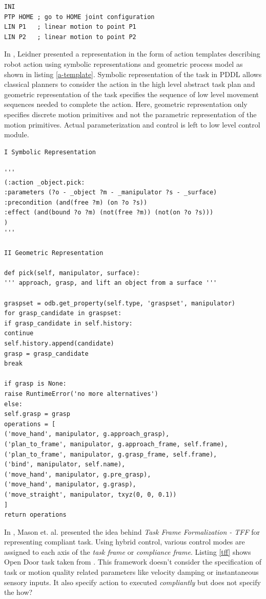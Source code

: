\documentclass[thesis]{mas_proposal}
\begin{document}
\begin{lstlisting}[label=KRL-sample,caption=KRL code]
INI
PTP HOME ; go to HOME joint configuration
LIN P1   ; linear motion to point P1
LIN P2	 ; linear motion to point P2
\end{lstlisting}

In \cite{leidner2017cognitive}, Leidner presented a representation in the form of action templates describing robot action using symbolic representations and geometric process model as shown in listing \ref{a-template}.  Symbolic representation of the task in PDDL allows classical planners to consider the action in the high level abstract task plan and geometric representation of the task specifies the sequence of low level movement sequences needed to complete the action. Here, geometric representation only specifies discrete motion primitives and not the parametric representation of the motion primitives. Actual parameterization and control is left to low level control module.   

\begin{lstlisting}[label=a-template,caption=Action Template: \_object.pick]
I Symbolic Representation 

'''
(:action _object.pick: 
:parameters (?o - _object ?m - _manipulator ?s - _surface) 
:precondition (and(free ?m) (on ?o ?s)) 
:effect (and(bound ?o ?m) (not(free ?m)) (not(on ?o ?s)))
) 
''' 

II Geometric Representation

def pick(self, manipulator, surface):
''' approach, grasp, and lift an object from a surface '''

graspset = odb.get_property(self.type, 'graspset', manipulator) 
for grasp_candidate in graspset: 
if grasp_candidate in self.history: 
continue
self.history.append(candidate) 
grasp = grasp_candidate 
break

if grasp is None: 
raise RuntimeError('no more alternatives')
else: 
self.grasp = grasp
operations = [
('move_hand', manipulator, g.approach_grasp), 
('plan_to_frame', manipulator, g.approach_frame, self.frame), ('plan_to_frame', manipulator, g.grasp_frame, self.frame), 
('bind', manipulator, self.name), 
('move_hand', manipulator, g.pre_grasp), 
('move_hand', manipulator, g.grasp), 
('move_straight', manipulator, txyz(0, 0, 0.1))
] 
return operations
\end{lstlisting}

In \cite{mason1981compliance}, Mason et. al. presented the idea behind \textit{Task Frame Formalization - TFF} for representing compliant task. Using hybrid control, various control modes are assigned to each axis of the \textit{task frame} or \textit{compliance frame}\cite{nagele2018prototype}. Listing \ref{tff} shows Open Door task taken from \cite{bruyninckx1996specification}. This framework doesn't consider the specification of task or motion quality related parameters like velocity damping or instantaneous sensory inputs. It also specify action to executed \textit{compliantly} but does not specify the how? 
\end{document}
